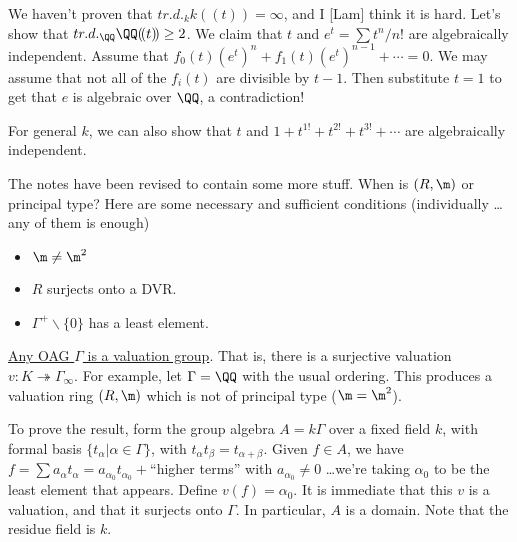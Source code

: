  We haven't proven that $tr.d._k k(\!(t)\!)=\infty$, and I [Lam] think it is hard. Let's
 show that $tr.d._\QQ \QQ(\!(t)\!)\ge 2$. We claim that $t$ and $e^t=\sum t^n/n!$ are
 algebraically independent. Assume that $f_0(t)(e^t)^n + f_1(t)(e^t)^{n-1}+\cdots =0$. We
 may assume that not all of the $f_i(t)$ are divisible by $t-1$. Then substitute $t=1$ to
 get that $e$ is algebraic over $\QQ$, a contradiction!

 For general $k$, we can also show that $t$ and $1+t^{1!}+t^{2!}+t^{3!}+\cdots$ are
 algebraically independent.
 \setcounter{lecture}{35}

 The notes have been revised to contain some more stuff. When is $(R,\m)$ or principal
 type? Here are some necessary and sufficient conditions (individually \dots any of them
 is enough)
 \begin{itemize}
   \item $\m\neq\m^2$
   \item $R$ surjects onto a DVR.
   \item $\Gamma^+\smallsetminus \{0\}$ has a least element.
 \end{itemize}

 \underline{Any OAG $\Gamma$ is a valuation group}. That is, there is a surjective
 valuation $v:K\twoheadrightarrow \Gamma_\infty$. For example, let $\Gamma=\QQ$ with the
 usual ordering. This produces a valuation ring $(R,\m)$ which is not of principal type
 ($\m=\m^2$).

 To prove the result, form the group algebra $A=k\Gamma$ over a fixed field $k$, with
 formal basis $\{t_\alpha|\alpha\in \Gamma\}$, with $t_\alpha t_\beta=t_{\alpha+\beta}$.
 Given $f\in A$, we have $f=\sum a_\alpha t_\alpha = a_{\alpha_0}t_{\alpha_0} + $``higher
 terms'' with $a_{\alpha_0}\neq0$ \dots we're taking $\alpha_0$ to be the least element
 that appears. Define $v(f)=\alpha_0$. It is immediate that this $v$ is a valuation, and
 that it surjects onto $\Gamma$. In particular, $A$ is a domain. Note that the residue
 field is $k$.

